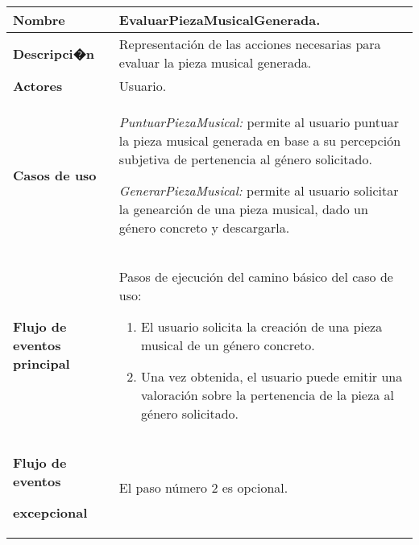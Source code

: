\begin{longtable}{|>{\columncolor[rgb]{0.75,0.75,0.75}}p{3cm}|p{11cm}|}
\hline \centerline{\textcolor[rgb]{1.00,1.00,1.00}{\textbf{\small
Nombre}}} & {\small EvaluarPiezaMusicalGenerada.}
\\
\hline \centerline{\textcolor[rgb]{1.00,1.00,1.00}{\textbf{\small
Descripci�n}}} & {\small Representación de las acciones necesarias para evaluar la pieza musical generada.}
\\
\hline \centerline{\textcolor[rgb]{1.00,1.00,1.00}{\textbf{\small
Actores}}} & {\small Usuario.}
\\
\hline
\begin{center}
\textcolor[rgb]{1.00,1.00,1.00}{\textbf{\small Casos de uso}}
\end{center}
\begin{center}

\end{center}
& {\small \emph{PuntuarPiezaMusical:} permite al usuario puntuar la pieza musical generada en base a su percepción subjetiva de pertenencia al género solicitado.}

{\small \emph{GenerarPiezaMusical:} permite al usuario solicitar la genearción de una pieza musical, dado un género concreto y descargarla.}

\\
\hline
\begin{center}
\end{center}
\begin{center}
\textcolor[rgb]{1.00,1.00,1.00}{\textbf{\small Flujo de eventos
principal}}
\end{center}
& {\small Pasos de ejecución del camino básico del caso de uso:}

{\small
\begin{enumerate}
    \item  El usuario solicita la creación de una pieza musical de un género concreto.

    \item  Una vez obtenida, el usuario puede emitir una valoración sobre la pertenencia de la pieza al género solicitado.
\end{enumerate}
}
\\
\hline \centerline{\textcolor[rgb]{1.00,1.00,1.00}{\textbf{\small
Flujo de eventos}}}
\centerline{\textcolor[rgb]{1.00,1.00,1.00}{\textbf{\small
excepcional}}} & {\small El paso número 2 es opcional.}
\\
\hline
\end{longtable}
